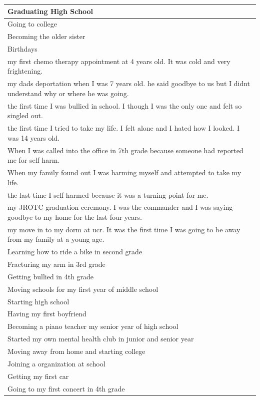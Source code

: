 \documentclass[
  .7em,
  letterpaper,
  DIV=11,
  numbers=noendperiod]{scrartcl}
\begin{document}
\begin{table}
\begin{tabular}{l}
\hline
Graduating High School\\
\hline
Going to college\\
\hline
Becoming the older sister\\
\hline
Birthdays\\
\hline
my first chemo therapy appointment at 4 years old. It was cold and very frightening.\\
\hline
my dads deportation when I was 7 years old. he said goodbye to us but I didnt understand why or where he was going.\\
\hline
the first time I was bullied in school. I though I was the only one and felt so singled out.\\
\hline
the first time I tried to take my life. I felt alone and I hated how I looked. I was 14 years old.\\
\hline
When I was called into the office in 7th grade because someone had reported me for self harm.\\
\hline
When my family found out I was harming myself and attempted to take my life.\\
\hline
the last time I self harmed because it was a turning point for me.\\
\hline
my JROTC graduation ceremony. I was the commander and I was saying goodbye to my home for the last four years.\\
\hline
my move in to my dorm at ucr. It was the first time I was going to be away from my family at a young age.\\
\hline
Learning how to ride a bike in second grade\\
\hline
Fracturing my arm in 3rd grade\\
\hline
Getting bullied in 4th grade\\
\hline
Moving schools for my first year of middle school\\
\hline
Starting high school\\
\hline
Having my first boyfriend\\
\hline
Becoming a piano teacher my senior year of high school\\
\hline
Started my own mental health club in junior and senior year\\
\hline
Moving away from home and starting college\\
\hline
Joining a organization at school\\
\hline
Getting my first car\\
\hline
Going to my first concert in 4th grade\\

\end{tabular}
\end{table}
\end{document}
